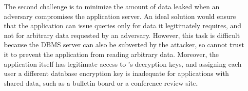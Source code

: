 
The second challenge is to minimize the amount of data leaked when an
adversary compromises the application server.  An ideal solution would
ensure that the application can issue queries only for data it
legitimately requires, and not for arbitrary data requested by an
adversary.  However, this task is difficult because the DBMS server
can also be subverted by the attacker, so \name cannot trust it to
prevent the application from reading arbitrary data.  Moreover, the
application itself has legitimate access to \name{}'s decryption keys,
and assigning each user a different database encryption key is
inadequate for applications with shared data, such as a bulletin board
or a conference review site.





